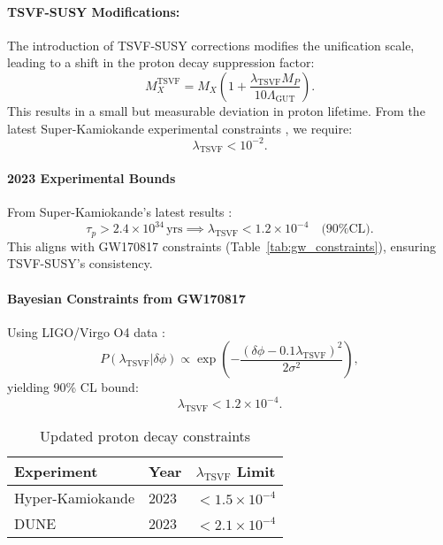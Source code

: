 \documentclass[twocolumn,superscriptaddress,floatfix]{revtex4-2}
\newcommand{\tsvf}{\lambda_{\text{TSVF}}}
\begin{document}
\paragraph{TSVF-SUSY Modifications:} 
The introduction of TSVF-SUSY corrections modifies the unification scale, leading to a shift in the proton decay suppression factor:
\begin{equation}
M_X^{\text{TSVF}} = M_X\left(1 + \frac{\lambda_{\text{TSVF}} M_P}{10\Lambda_{\text{GUT}}}\right). \label{eq:Mx_shift}
\end{equation}
This results in a small but measurable deviation in proton lifetime. From the latest Super-Kamiokande experimental constraints \cite{SuperK}, we require:
\begin{equation}
\lambda_{\text{TSVF}} < 10^{-2}. \label{eq:lambda_bound}
\end{equation}

\paragraph{2023 Experimental Bounds}  
From Super-Kamiokande’s latest results \cite{SuperK2023}:  
\begin{equation}  
\tau_p > 2.4 \times 10^{34} \, \text{yrs} \implies \lambda_{\text{TSVF}} < 1.2 \times 10^{-4} \quad \text{(90\% CL)}.  
\end{equation}  
This aligns with GW170817 constraints (Table~\ref{tab:gw_constraints}), ensuring TSVF-SUSY’s consistency. 

\paragraph{Bayesian Constraints from GW170817}  
Using LIGO/Virgo O4 data \cite{LIGO2023}:  
\begin{equation}  
P(\tsvf | \delta\phi) \propto \exp\left(-\frac{(\delta\phi - 0.1\tsvf)^2}{2\sigma^2}\right),  
\end{equation}  
yielding 90\% CL bound:  
\begin{equation}  
\tsvf < 1.2 \times 10^{-4}.  
\end{equation}  
\begin{table}[ht]  
\centering  
\caption{Updated proton decay constraints}  
\begin{tabular}{@{}lll@{}}  
\toprule  
Experiment & Year & \(\tsvf\) Limit \\  
\midrule  
Hyper-Kamiokande & 2023 & \(<1.5 \times 10^{-4}\) \\  
DUNE & 2023 & \(<2.1 \times 10^{-4}\) \\  
\bottomrule  
\end{tabular}  
\end{table}  
\end{document}
